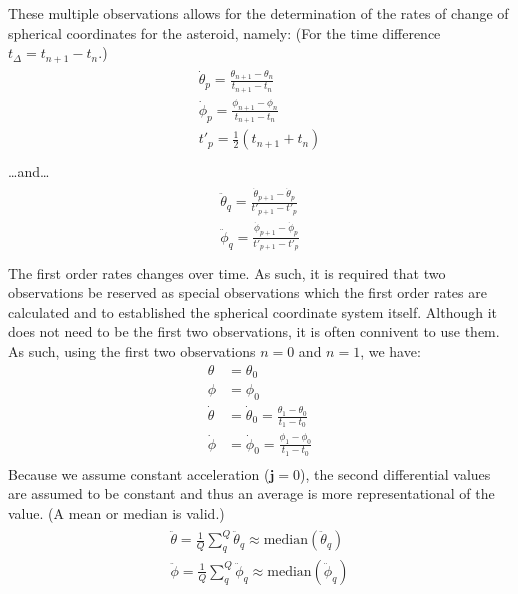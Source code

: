 \documentclass[letterpaper,11pt,english]{sphinxmanual}
\begin{document}
\sphinxAtStartPar
These multiple observations allows for the determination of the rates of
change of spherical coordinates for the asteroid, namely: (For the time
difference \(t_\Delta = t_{n+1} - t_n\).)
\begin{align*}\!\begin{aligned}
\dot\theta_p = \frac{\theta_{n+1} - \theta_{n}}{t_{n+1} - t_n}\\
\dot\phi_p = \frac{\phi_{n+1} - \phi_{n}}{t_{n+1} - t_n}\\
t'_p = \frac{1}{2} \left( t_{n+1} + t_n \right)\\
\end{aligned}\end{align*}
\sphinxAtStartPar
…and…
\begin{align*}\!\begin{aligned}
\ddot\theta_q = \frac{\dot\theta_{p+1} - \dot\theta_{p}}{t'_{p+1} - t'_p}\\
\ddot\phi_q = \frac{\dot\phi_{p+1} - \dot\phi_{p}}{t'_{p+1} - t'_p}\\
\end{aligned}\end{align*}
\sphinxAtStartPar
The first order rates changes over time. As such, it is required that two
observations be reserved as special observations which the first order rates
are calculated and to established the spherical coordinate system itself.
Although it does not need to be the first two observations, it is often
connivent to use them. As such, using the first two observations
\(n=0\) and \(n=1\), we have:
\begin{equation*}
\begin{split}\theta &= \theta_0 \\
\phi &= \phi_0 \\
\dot\theta &= \dot\theta_0 = \frac{\theta_1 - \theta_0}{t_1 - t_0} \\
\dot\phi &= \dot\phi_0 = \frac{\phi_1 - \phi_0}{t_1 - t_0} \\\end{split}
\end{equation*}
\sphinxAtStartPar
Because we assume constant acceleration (\(\mathbf{j} = 0\)), the second
differential values are assumed to be constant and thus an average is more
representational of the value. (A mean or median is valid.)
\begin{align*}\!\begin{aligned}
\ddot\theta = \frac{1}{Q} \sum_q^Q \ddot\theta_q \approx \mathrm{median} (\ddot\theta_q)\\
\ddot\phi = \frac{1}{Q} \sum_q^Q \ddot\phi_q \approx \mathrm{median} (\ddot\phi_q)\\
\end{aligned}\end{align*}
\end{document}

